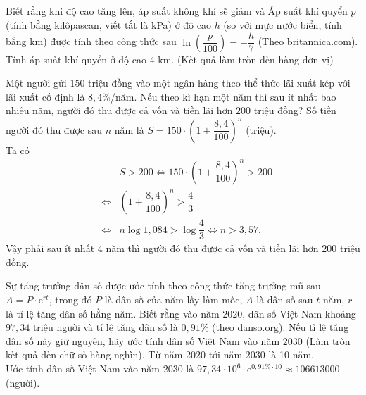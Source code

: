 \begin{bt}%
Biết rằng khi độ cao tăng lên, áp suất không khí sẽ giảm và Áp suất khí quyển $p$ (tính bằng kilôpascan, viết tắt là kPa) ở độ cao $h$ (so với mực nước biển, tính bằng km) được tính theo công thức sau $\ln\left(\dfrac{p}{100}\right) = -\dfrac{h}{7}$
(Theo britannica.com).  Tính áp suất khí quyển ở độ cao 4 km. (Kết quả làm tròn đến hàng đơn vị)
\end{bt}

\begin{bt}%

	Một người gửi $150$ triệu đồng vào một ngân hàng theo thể thức lãi xuất kép với lãi xuất cố định là $8,4\%$/năm. Nếu theo kì hạn một năm thì sau ít nhất bao nhiêu năm, người đó thu được cả vốn và tiền lãi hơn $200$ triệu đồng?
	\loigiai
	{
		Số tiền người đó thu được sau $n$ năm là $S=150\cdot{\left(1+\dfrac{8,4}{100}\right)^n}$ (triệu).\\
		Ta có 
		\begin{eqnarray*}
			& & S>200\Leftrightarrow 150 \cdot{\left(1+\dfrac{8,4}{100}\right)^n}>200\\
			&\Leftrightarrow &{\left(1+\dfrac{8,4}{100}\right)^n}>\dfrac{4}{3}\\
			&\Leftrightarrow& n\log 1,084>\log \dfrac{4}{3}\Leftrightarrow n>3{,}57.
		\end{eqnarray*}
		Vậy phải sau ít nhất $4$ năm thì người đó thu được cả vốn và tiền lãi hơn $200$ triệu đồng.
	}
\end{bt}

\begin{bt}%

	Sự tăng trưởng dân số được ước tính theo công thức tăng trưởng mũ sau $A=P \cdot \mathrm{e}^{rt}$, trong đó $P$ là dân số của năm lấy làm mốc, $A$ là dân số sau $t$ năm, $r$ là tỉ lệ tăng dân số hằng năm. Biết rằng vào năm $2020$, dân số Việt Nam khoảng $97{,}34$ triệu người và tỉ lệ tăng dân số là $0,91\% $ (theo danso.org). Nếu tỉ lệ tăng dân số này giữ nguyên, hãy ước tính dân số Việt Nam vào năm $2030$ (Làm tròn kết quả đến chữ số hàng nghìn).
	\loigiai
	{
		Từ năm 2020 tới năm 2030 là 10 năm.\\
		Ước tính dân số Việt Nam vào năm 2030 là $97{,}34 \cdot 10^6 \cdot \mathrm{e}^{0{,}91\% \cdot 10} \approx 106613000$ (người).
	}
\end{bt}

